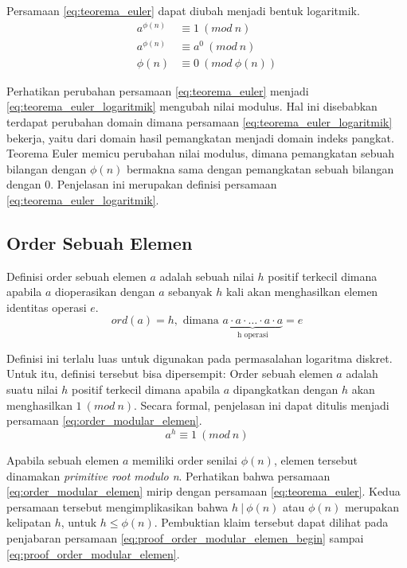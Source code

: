 Persamaan \eqref{eq:teorema_euler} dapat diubah menjadi bentuk logaritmik.
\begin{align}
a^{\phi(n)} &\equiv 1\ (mod\ n) \\
a^{\phi(n)} &\equiv a^0\ (mod\ n) \\
\phi(n) &\equiv 0\ (mod\ \phi(n))
\label{eq:teorema_euler_logaritmik}
\end{align}

Perhatikan perubahan persamaan \eqref{eq:teorema_euler} menjadi \eqref{eq:teorema_euler_logaritmik} mengubah nilai modulus. Hal ini disebabkan terdapat perubahan domain dimana persamaan \eqref{eq:teorema_euler_logaritmik} bekerja, yaitu dari domain hasil pemangkatan menjadi domain indeks pangkat. Teorema Euler memicu perubahan nilai modulus, dimana pemangkatan sebuah bilangan dengan $ \phi(n) $ bermakna sama dengan pemangkatan sebuah bilangan dengan $ 0 $. Penjelasan ini merupakan definisi persamaan \eqref{eq:teorema_euler_logaritmik}.

\subsection{Order Sebuah Elemen}

Definisi order sebuah elemen $ a $ adalah sebuah nilai $ h $ positif terkecil dimana apabila $ a $ dioperasikan dengan $ a $ sebanyak $ h $ kali akan menghasilkan elemen identitas operasi $ e $.\cite{harald_applied_number_theory}
\begin{equation}
ord(a)=h,\text{ dimana }\underbrace{a\cdot a\cdot\ldots\cdot a\cdot a}_{\text{h operasi}}=e
\label{eq:order_elemen}
\end{equation}

Definisi ini terlalu luas untuk digunakan pada permasalahan logaritma diskret. Untuk itu, definisi tersebut bisa dipersempit: Order sebuah elemen $ a $ adalah suatu nilai $ h $ positif terkecil dimana apabila $ a $ dipangkatkan dengan $ h $ akan menghasilkan $ 1\ (mod\ n) $. Secara formal, penjelasan ini dapat ditulis menjadi persamaan \eqref{eq:order_modular_elemen}.
\begin{equation}
a^h\equiv 1\ (mod\ n)
\label{eq:order_modular_elemen}
\end{equation}

Apabila sebuah elemen $ a $ memiliki order senilai $ \phi(n) $, elemen tersebut dinamakan \textit{primitive root modulo n}.
Perhatikan bahwa persamaan \eqref{eq:order_modular_elemen} mirip dengan persamaan \eqref{eq:teorema_euler}. Kedua persamaan tersebut mengimplikasikan bahwa $ h\ |\ \phi(n) $ atau $ \phi(n) $ merupakan kelipatan $ h $, untuk $ h\leq \phi(n) $. Pembuktian klaim tersebut dapat dilihat pada penjabaran persamaan \eqref{eq:proof_order_modular_elemen_begin} sampai \eqref{eq:proof_order_modular_elemen}.

